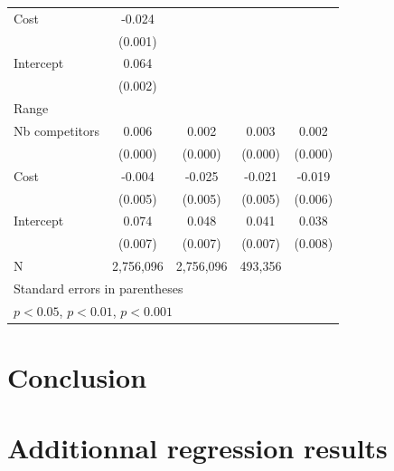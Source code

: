\documentclass[11pt]{article}
\begin{document}
\begin{table}[htbp]
\begin{tabular}{lcccc }
Cost                     & -0.024\sym{***}  &        \sym{}    &       \sym{}     &\\
{}                       & (0.001)          &                  &                  &\\
Intercept                &  0.064\sym{***}  &        \sym{}    &       \sym{}     &\\
{}                       & (0.002)          &                  &                  &\\
\hline
Range & & & & \\
\hline
Nb competitors           &  0.006\sym{***}  &  0.002\sym{***}  &  0.003\sym{***}  &  0.002\sym{***} \\
{}                       & (0.000)          & (0.000)          & (0.000)          & (0.000)         \\
Cost                     & -0.004\sym{}     & -0.025\sym{***}  & -0.021\sym{***}  & -0.019\sym{***} \\
{}                       & (0.005)          & (0.005)          & (0.005)          & (0.006)         \\
Intercept                &  0.074\sym{***}  & 0.048\sym{***}   &  0.041\sym{***}  &  0.038\sym{***} \\
{}                       & (0.007)          & (0.007)          & (0.007)          & (0.008)         \\
\hline
N                        & 2,756,096        & 2,756,096        & 493,356          &\\
\hline\hline
\multicolumn{4}{l}{\footnotesize Standard errors in parentheses}\\
\multicolumn{4}{l}{\footnotesize \sym{*} \(p<0.05\), \sym{**} \(p<0.01\), \sym{***} \(p<0.001\)}\\
\end{tabular}
\end{table}

\section{Conclusion}

\newpage



\newpage

\appendix

\section{Additionnal regression results}
\end{document}
